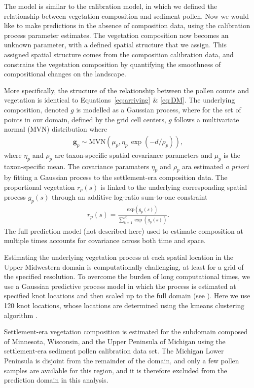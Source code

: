 \documentclass[12pt]{article}
\begin{document}
The model is similar to the calibration model, in which we defined the
relationship between vegetation composition and sediment pollen. Now
we would like to make predictions in the absence of composition data,
using the calibration process parameter estimates. The vegetation
composition now becomes an unknown parameter, with a defined spatial
structure that we assign. This assigned spatial structure comes from
the composition calibration data, and constrains the vegetation
composition by quantifying the smoothness of compositional changes on
the landscape.

More specifically, the structure of the relationship between the
pollen counts and vegetation is identical to
Equations~\ref{eq:arriving} \& \ref{eq:DM}. The underlying
composition, denoted $g$ is modelled as a Gaussian process, where for
the set of points in our domain, defined by the grid cell centers, $g$
follows a multivariate normal (MVN) distribution where
\begin{align*}
\bm{g}_p \sim \text{MVN}(\mu_p, \eta_p \, \exp(-d/\rho_p)),
\end{align*}
where $\eta_p$ and $\rho_p$ are taxon-specific spatial covariance
parameters and $\mu_p$ is the taxon-specific mean.  The covariance
paramaters $\eta_p$ and $\rho_p$ ara estimated \textit{a priori} by
fitting a Gaussian process to the settlement-era composition data.
The proportional vegetation $r_p(s)$ is linked to the underlying
corresponding spatial process $g_p(s)$ through an additive log-ratio
sum-to-one constraint
\begin{align*}
r_p(s) = \frac{ \text{exp}(g_p(s))}{ \sum_{k=1}^K \exp (g_p(s)) }.
\end{align*} 
The full prediction model (not described here) used to estimate
composition at multiple times accounts for covariance across both time
and space. 

Estimating the underlying vegetation process at each spatial location
in the Upper Midwestern domain is computationally challenging, at
least for a grid of the specified resolution. To overcome the burden
of long computational times, we use a Gaussian predictive process
model in which the process is estimated at specified knot locations
and then scaled up to the full domain (see
\cite{finley2009improving}). Here we use 120 knot locations, whose
locations are determined using the kmeans clustering algorithm
\cite{macqueen1967some}.

Settlement-era vegetation composition is estimated for the subdomain
composed of Minnesota, Wisconsin, and the Upper Peninsula of Michigan
using the settlement-era sediment pollen calibration data set. The
Michigan Lower Peninsula is disjoint from the remainder of the domain,
and only a few pollen samples are available for this region, and it is
therefore excluded from the prediction domain in this analysis.
\end{document}

